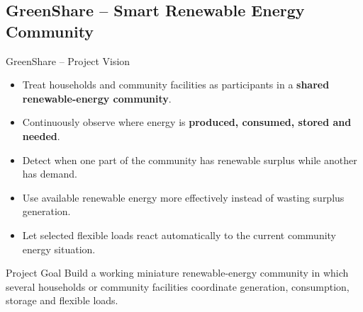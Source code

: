 \subsection{GreenShare -- Smart Renewable Energy Community}

\begin{frame}{GreenShare -- Project Vision}
\begin{itemize}
    \item Treat households and community facilities as participants in a \textbf{shared renewable-energy community}.
    \item Continuously observe where energy is \textbf{produced, consumed, stored and needed}.
    \item Detect when one part of the community has renewable surplus while another has demand.
    \item Use available renewable energy more effectively instead of wasting surplus generation.
    \item Let selected flexible loads react automatically to the current community energy situation.
\end{itemize}

\begin{block}{Project Goal}
Build a working miniature renewable-energy community in which several households or community facilities coordinate generation, consumption, storage and flexible loads.
\end{block}
\end{frame}
